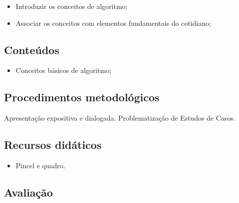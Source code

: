 \documentclass[oneside,a4paper,12pt]{article}
\begin{document}
    \begin{itemize}

      \item Introduzir os conceitos de algoritmo;
      \item Associar os conceitos com elementos fundamentais do cotidiano;

    \end{itemize}

  \begin{snugshade}
  \section{Conteúdos} %
  \end{snugshade}

    \begin{itemize}

      \item Conceitos básicos de algoritmo;

    \end{itemize}

  \begin{snugshade}
  \section{Procedimentos metodológicos} %
  \end{snugshade}

	Apresentação expositiva e dialogada. Problematização de Estudos de Casos.

  \begin{snugshade}
  \section{Recursos didáticos} %
  \end{snugshade}

    \begin{itemize}

	  \item Pincel e quadro.

    \end{itemize}

  \begin{snugshade}
  \section{Avaliação} %
  \end{snugshade}
\end{document}
